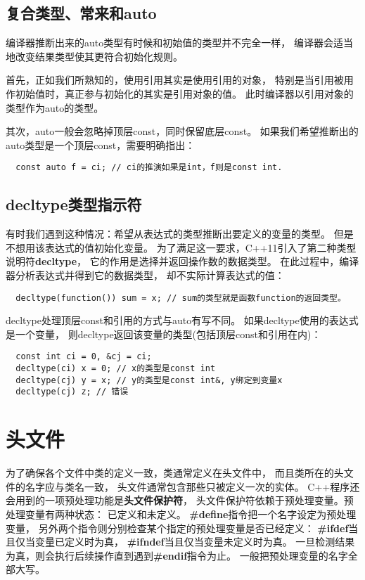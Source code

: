 \subsection{复合类型、常来和auto}
编译器推断出来的auto类型有时候和初始值的类型并不完全一样，%
编译器会适当地改变结果类型使其更符合初始化规则。%
\par
首先，正如我们所熟知的，使用引用其实是使用引用的对象，%
特别是当引用被用作初始值时，真正参与初始化的其实是引用对象的值。%
此时编译器以引用对象的类型作为auto的类型。
\par
其次，auto一般会忽略掉顶层const，同时保留底层const。%
如果我们希望推断出的auto类型是一个顶层const，需要明确指出：
\begin{lstlisting}
  const auto f = ci; // ci的推演如果是int，f则是const int.
\end{lstlisting}
\subsection{decltype类型指示符}
有时我们遇到这种情况：希望从表达式的类型推断出要定义的变量的类型。%
但是不想用该表达式的值初始化变量。%
为了满足这一要求，C++11引入了第二种类型说明符{\bfseries{decltype}}，%
它的作用是选择并返回操作数的数据类型。%
在此过程中，编译器分析表达式并得到它的数据类型，%
却不实际计算表达式的值：
\begin{lstlisting}
  decltype(function()) sum = x; // sum的类型就是函数function的返回类型。
\end{lstlisting}
\par
decltype处理顶层const和引用的方式与auto有写不同。%
如果decltype使用的表达式是一个变量，%
则decltype返回该变量的类型(包括顶层const和引用在内)：
\begin{lstlisting}
  const int ci = 0, &cj = ci;
  decltype(ci) x = 0; // x的类型是const int
  decltype(cj) y = x; // y的类型是const int&, y绑定到变量x
  decltype(cj) z; // 错误
\end{lstlisting}

\section{头文件}
为了确保各个文件中类的定义一致，类通常定义在头文件中，%
而且类所在的头文件的名字应与类名一致，%
头文件通常包含那些只被定义一次的实体。%
C++程序还会用到的一项预处理功能是{\bfseries{头文件保护符}}，%
头文件保护符依赖于预处理变量。预处理变量有两种状态：%
已定义和未定义。%
{\bfseries{\#define}}指令把一个名字设定为预处理变量，%
另外两个指令则分别检查某个指定的预处理变量是否已经定义：%
{\bfseries{\#ifdef}}当且仅当变量已定义时为真，%
{\bfseries{\#ifndef}}当且仅当变量未定义时为真。%
一旦检测结果为真，则会执行后续操作直到遇到{\bfseries{\#endif}}指令为止。%
一般把预处理变量的名字全部大写。





